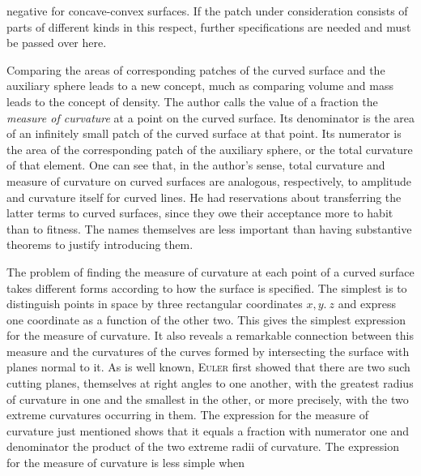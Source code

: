 %
negative for concave-convex surfaces. If the patch under consideration consists of parts of different kinds in this respect, further specifications are needed and must be passed over here.

Comparing the areas of corresponding patches of the curved surface and the auxiliary sphere leads to a new concept, much as comparing volume and mass leads to the concept of density. The author calls the value of a fraction the \textit{measure of curvature} at a point on the curved surface. Its denominator is the area of an infinitely small patch of the curved surface at that point. Its numerator is the area of the corresponding patch of the auxiliary sphere, or the total curvature of that element. One can see that, in the author's sense, total curvature and measure of curvature on curved surfaces are analogous, respectively, to amplitude and curvature itself for curved lines. He had reservations about transferring the latter terms to curved surfaces, since they owe their acceptance more to habit than to fitness. The names themselves are less important than having substantive theorems to justify introducing them.

The problem of finding the measure of curvature at each point of a curved surface takes different forms according to how the surface is specified. The simplest is to distinguish points in space by three rectangular coordinates \(x,y.\ z\) and express one coordinate as a function of the other two. This gives the simplest expression for the measure of curvature. It also reveals a remarkable connection between this measure and the curvatures of the curves formed by intersecting the surface with planes normal to it. As is well known, \textsc{Euler} first showed that there are two such cutting planes, themselves at right angles to one another, with the greatest radius of curvature in one and the smallest in the other, or more precisely, with the two extreme curvatures occurring in them. The expression for the measure of curvature just mentioned shows that it equals a fraction with numerator one and denominator the product of the two extreme radii of curvature. The expression for the measure of curvature is less simple when
